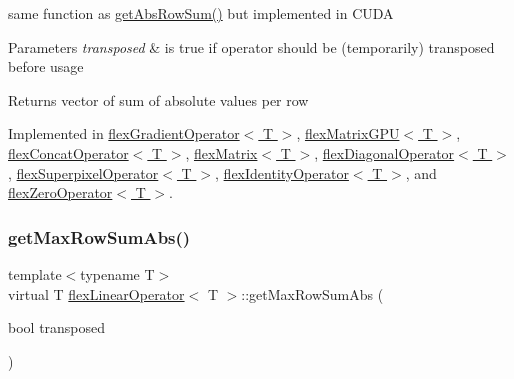 same function as \hyperlink{classflex_linear_operator_ad6caa7b09e6e3c401cadef61b8e2307e}{get\+Abs\+Row\+Sum()} but implemented in C\+U\+DA 


\begin{DoxyParams}{Parameters}
{\em transposed} & is true if operator should be (temporarily) transposed before usage \\
\hline
\end{DoxyParams}
\begin{DoxyReturn}{Returns}
vector of sum of absolute values per row 
\end{DoxyReturn}


Implemented in \hyperlink{classflex_gradient_operator_ac5cf151db87946ac0f1864344db260d5}{flex\+Gradient\+Operator$<$ T $>$}, \hyperlink{classflex_matrix_g_p_u_ab9fceb951d911794d4c70f5045255abd}{flex\+Matrix\+G\+P\+U$<$ T $>$}, \hyperlink{classflex_concat_operator_a76e35865b16975bfcd6431879bda195b}{flex\+Concat\+Operator$<$ T $>$}, \hyperlink{classflex_matrix_ae713d5dabcdab30df9b04f2a7d499235}{flex\+Matrix$<$ T $>$}, \hyperlink{classflex_diagonal_operator_a71cdb6ea6b8b7ceabaf538a180c8dcf4}{flex\+Diagonal\+Operator$<$ T $>$}, \hyperlink{classflex_superpixel_operator_ae2f878d68c4574a0d5f21ffd132afc63}{flex\+Superpixel\+Operator$<$ T $>$}, \hyperlink{classflex_identity_operator_ae12ebab61f7f39b0d1f636ad1d27c77a}{flex\+Identity\+Operator$<$ T $>$}, and \hyperlink{classflex_zero_operator_ad63f43f4b1abe71779e5b0ee364b93d1}{flex\+Zero\+Operator$<$ T $>$}.

\mbox{\label{classflex_linear_operator_afcb74697385ccb7c8d29870d7034c12a}} 
\subsubsection{\texorpdfstring{get\+Max\+Row\+Sum\+Abs()}{getMaxRowSumAbs()}}
{\footnotesize\ttfamily template$<$typename T$>$ \\
virtual T \hyperlink{classflex_linear_operator}{flex\+Linear\+Operator}$<$ T $>$\+::get\+Max\+Row\+Sum\+Abs (\begin{DoxyParamCaption}\item[{bool}]{transposed }\end{DoxyParamCaption})\hspace{0.3cm}{\ttfamily [pure virtual]}}



